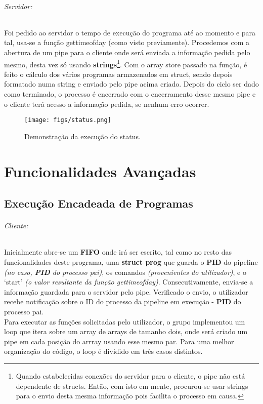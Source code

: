 \documentclass[11.5pt,a4paper]{report}
\begin{document}
\subparagraph{Servidor:}

Foi pedido ao servidor o tempo de execução do programa até ao momento e para tal, usa-se a função gettimeofday (como visto previamente). Procedemos com a abertura de um pipe para o cliente onde será enviada a informação pedida pelo mesmo, desta vez só usando \textbf{strings}\footnote{Quando estabelecidas conexões do servidor para o cliente, o pipe não está dependente de structs. Então, com isto em mente, procurou-se usar strings para o envio desta mesma informação pois facilita o processo em causa.}.
Com o array store passado na função, é feito o cálculo dos vários programas armazenados em struct, sendo depois formatado numa string e enviado pelo pipe acima criado. Depois do ciclo ser dado como terminado, o processo é encerrado com o encerramento desse mesmo pipe e o cliente terá acesso a informação pedida, se nenhum erro ocorrer.\\

\begin{figure}[h]
    \centering
    \texttt{[image: figs/status.png]}
    \caption{Demonstração da execução do status.}
    \label{f}
\end{figure}

\newpage
\chapter{Funcionalidades Avançadas}
\section{Execução Encadeada de Programas}

\subparagraph{Cliente:} Inicialmente abre-se um \textbf{FIFO} onde irá ser escrito, tal como no resto das funcionalidades deste programa, uma \textbf{struct prog} que guarda o \textbf{PID} do pipeline \textit{(no caso, \textbf{PID} do processo pai)}, os comandos \textit{(provenientes do utilizador)}, e o ‘start’ \textit{(o valor resultante da função gettimeofday)}. Consecutivamente, envia-se a informação guardada para o servidor pelo pipe. Verificado o envio, o utilizador recebe notificação sobre o ID do processo da pipeline em execução - \textbf{PID} do processo pai.\\

Para executar as funções solicitadas pelo utilizador, o grupo implementou um loop que itera sobre um array de arrays de tamanho dois, onde será criado um pipe em cada posição do arrray usando esse mesmo par. Para uma melhor organização do código, o loop é dividido em três casos distintos.
\end{document}
